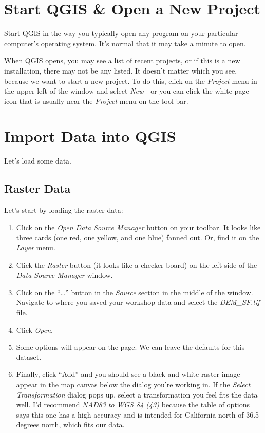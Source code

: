 \documentclass[
]{article}
\providecommand{\tightlist}{%
  \setlength{\itemsep}{0pt}\setlength{\parskip}{0pt}}
\begin{document}
\hypertarget{start-qgis-open-a-new-project}{%
\section{Start QGIS \& Open a New Project}\label{start-qgis-open-a-new-project}}

Start QGIS in the way you typically open any program on your particular computer's operating system. It's normal that it may take a minute to open.

When QGIS opens, you may see a list of recent projects, or if this is a new installation, there may not be any listed. It doesn't matter which you see, because we want to start a new project. To do this, click on the \emph{Project} menu in the upper left of the window and select \emph{New} - or you can click the white page icon that is usually near the \emph{Project} menu on the tool bar.

\hypertarget{import-data-into-qgis}{%
\section{Import Data into QGIS}\label{import-data-into-qgis}}

Let's load some data.

\hypertarget{raster-data-1}{%
\subsection{Raster Data}\label{raster-data-1}}

Let's start by loading the raster data:

\begin{enumerate}
\def\labelenumi{\arabic{enumi}.}
\tightlist
\item
  Click on the \emph{Open Data Source Manager} button on your toolbar. It looks like three cards (one red, one yellow, and one blue) fanned out. Or, find it on the \emph{Layer} menu.
\item
  Click the \emph{Raster} button (it looks like a checker board) on the left side of the \emph{Data Source Manager} window.
\item
  Click on the ``\ldots{}'' button in the \emph{Source} section in the middle of the window. Navigate to where you saved your workshop data and select the \emph{DEM\_SF.tif} file.
\item
  Click \emph{Open}.
\item
  Some options will appear on the page. We can leave the defaults for this dataset.
\item
  Finally, click ``Add'' and you should see a black and white raster image appear in the map canvas below the dialog you're working in. If the \emph{Select Transformation} dialog pops up, select a transformation you feel fits the data well. I'd recommend \emph{NAD83 to WGS 84 (43)} because the table of options says this one has a high accuracy and is intended for California north of 36.5 degrees north, which fits our data.
\end{enumerate}
\end{document}
